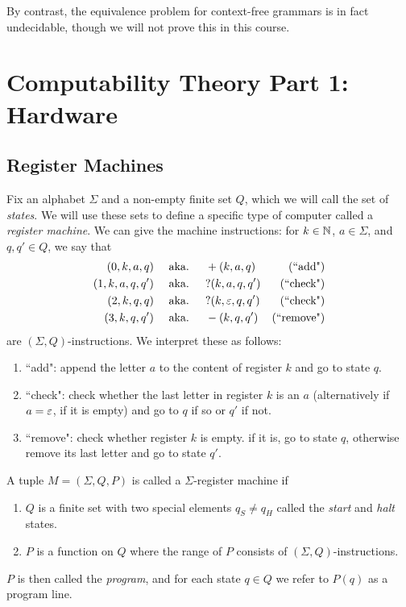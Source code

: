 \documentclass{article}
\begin{document}
By contrast, the equivalence problem for context-free grammars is in fact undecidable, though we will not prove this in this course.

\pagebreak
\section{Computability Theory Part 1: Hardware}
\subsection{Register Machines}

Fix an alphabet $\Sigma$ and a non-empty finite set $Q$, which we will call the set of \textit{states}. We will use these sets to define a specific type of computer called a \textit{register machine}. We can give the machine instructions: for $k \in \mathbb{N}$, $a \in \Sigma$, and $q, q' \in Q$, we say that
\begin{align*}
	(0, k, a, q) \quad     & \text{ aka. } \quad +(k, a, q)        & \text{(``add")}    \\
	(1, k, a, q, q') \quad & \text{ aka. } \quad ?(k, a, q, q')    & \text{(``check")}  \\
	(2, k, q, q) \quad     & \text{ aka. } \quad ?(k, \varepsilon, q, q') & \text{(``check")}  \\
	(3, k, q, q') \quad    & \text{ aka. } \quad -(k, q, q')       & \text{(``remove")} 
\end{align*}
are $(\Sigma,Q)$-instructions. We interpret these as follows:
\begin{enumerate}
	\item ``add": append the letter $a$ to the content of register $k$ and go to state $q$.
	\item ``check": check whether the last letter in register $k$ is an $a$ (alternatively if $a = \varepsilon$, if it is empty) and go to $q$ if so or $q'$ if not.
	\item ``remove": check whether register $k$ is empty. if it is, go to state $q$, otherwise remove its last letter and go to state $q'$.
\end{enumerate}

\begin{definition}
	A tuple $M = (\Sigma, Q, P)$ is called a $\Sigma$-register machine if
	\begin{enumerate}
		\item $Q$ is a finite set with two special elements $q_S \neq q_H$ called the \textit{start} and \textit{halt} states.
		\item $P$ is a function on $Q$ where the range of $P$ consists of $(\Sigma, Q)$-instructions.
	\end{enumerate}
	$P$ is then called the \textit{program}, and for each state $q \in Q$ we refer to $P(q)$ as a program line.
\end{definition}
\end{document}

